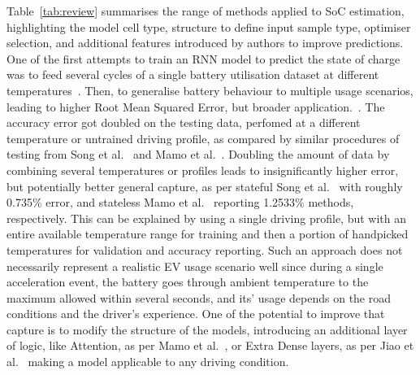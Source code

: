 \mbox{Table~\ref{tab:review}} summarises the range of methods applied to SoC estimation, highlighting the model cell type, structure to define input sample type, optimiser selection, and additional features introduced by authors to improve predictions.
One of the first attempts to train an RNN model to predict the state of charge was to feed several cycles of a single battery utilisation dataset at different temperatures~\cite{song_lithium-ion_2018, xiao_accurate_2019,javid_adaptive_2020, jiao_gru-rnn_2020}.
Then, to generalise battery behaviour to multiple usage scenarios, leading to higher Root Mean Squared Error, but broader application.~\cite{mamo_long_2020}.
The accuracy error got doubled on the testing data, perfomed at a different temperature or untrained driving profile, as compared by similar procedures of testing from Song et al.~\cite{song_lithium-ion_2018} and Mamo et al.~\cite{mamo_long_2020}.
Doubling the amount of data by combining several temperatures or profiles leads to insignificantly higher error, but potentially better general capture, as per stateful Song et al.~\cite{song_lithium-ion_2018} with roughly 0.735\% error, and stateless Mamo et al.~\cite{mamo_long_2020} reporting 1.2533\% methods, respectively.
This can be explained by using a single driving profile, but with an entire available temperature range for training and then a portion of handpicked temperatures for validation and accuracy reporting.
Such an approach does not necessarily represent a realistic EV usage scenario well since during a single acceleration event, the battery goes through ambient temperature to the maximum allowed within several seconds, and its' usage depends on the road conditions and the driver's experience.
One of the potential to improve that capture is to modify the structure of the models, introducing an additional layer of logic, like Attention, as per Mamo et al.~\cite{mamo_long_2020}, or Extra Dense layers, as per Jiao et al.~\cite{jiao_gru-rnn_2020} making a model applicable to any driving condition.
